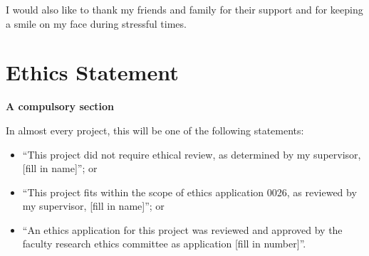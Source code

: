 \documentclass[oneside,%
                    author={Malak Hajji},
                    degree={BSc},
                    title={Designing An Accessible Ozobot Programming Platform for Students},
                  subtitle={With Mixed Visual Abilities}]{dissertation}
\begin{document}
I would also like to thank my friends and family for their support and for keeping a smile on my face during stressful times.






%







\makedecl





\tableofcontents
\listoffigures
\listoftables




\chapter*{Ethics Statement}

{\bf A compulsory section} 
\vspace{1cm} 

In almost every project, this will be one of the following statements:
    \begin{itemize}
        \item ``This project did not require ethical review, as determined by my supervisor, [fill in name]''; or
        \item ``This project fits within the scope of ethics application 0026, as reviewed by my supervisor, [fill in name]''; or
        \item ``An ethics application for this project was reviewed and approved by the faculty research ethics committee as application [fill in number]''.
    \end{itemize}
    
\end{document}
